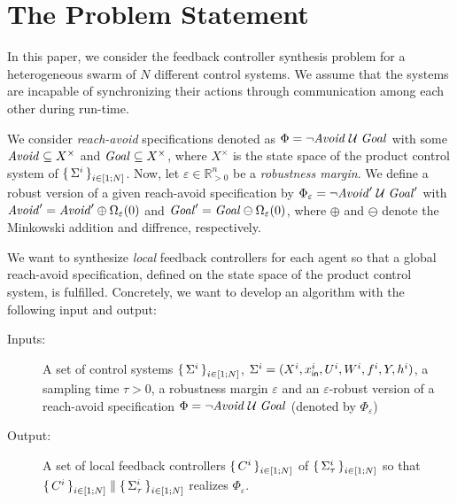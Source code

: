 
\section{The Problem Statement}
\label{sec:problem}
In this paper, we consider the feedback controller synthesis problem for a heterogeneous swarm of $N$ different control systems.
We assume that the systems are incapable of synchronizing their actions through communication among each other during run-time.

We consider \emph{reach-avoid} specifications denoted as $\Phi=\lnot\mathit{Avoid}\;\mathcal{U}\;\mathit{Goal}$ with some $\mathit{Avoid}\subseteq X^\times$ and $\mathit{Goal}\subseteq X^\times$, where $X^\times$ is the state space of the product control system of $\set{\Sigma^i}_{i\in [1;N]}$. Now, let $\varepsilon\in \mathbb{R}^n_{>0}$ be a \emph{robustness margin}. We define a robust version of a given reach-avoid specification by $\Phi_\varepsilon=\lnot\mathit{Avoid}'\;\mathcal{U}\;\mathit{Goal}'$ with $\mathit{Avoid}'=\mathit{Avoid}'\oplus\Omega_\varepsilon(0)$ and $\mathit{Goal}'=\mathit{Goal}\ominus\Omega_\varepsilon(0)$, where $\oplus$ and $\ominus$ denote the Minkowski addition and diffrence, respectively. %


We want to synthesize \emph{local} feedback controllers for each agent so that a global reach-avoid specification, defined on the state space of the product control system, is fulfilled.
Concretely, we want to develop an algorithm with the following input and output:
\begin{description}
	\item[Inputs:] A set of control systems $\set{\Sigma^i}_{i\in [1;N]}$, $\Sigma^i=(X^i,x_{\mathsf{in}}^i,U^i,W^i,f^i,Y,h^i)$, a sampling time $\tau >0$, a robustness margin $\varepsilon$ and an $\varepsilon$-robust version of a reach-avoid specification $\Phi=\lnot\mathit{Avoid}\;\mathcal{U}\;\mathit{Goal}$ (denoted by $\Phi_\varepsilon$)%
	\item[Output:] A set of local feedback controllers $\set{C^i}_{i\in [1;N]}$ of $\set{\Sigma^i_\tau}_{i\in [1;N]}$ so that $\set{C^i}_{i\in [1;N]}\parallel \set{\Sigma_\tau^i}_{i\in [1;N]}$ realizes $\Phi_\varepsilon$. 
\end{description}

